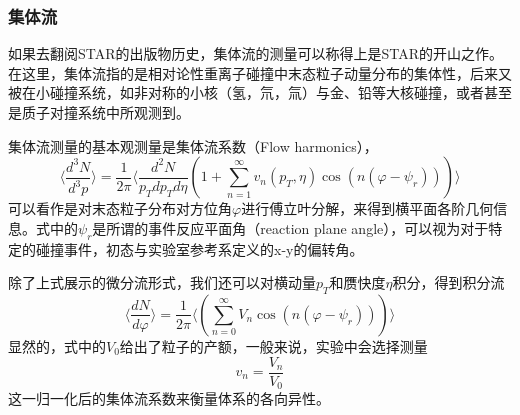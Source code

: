 \documentclass[%
 reprint,
 amsmath,amssymb,
 aps,
]{revtex4-1}
\begin{document}
\subsubsection{\label{sec:Flow}集体流}
如果去翻阅STAR的出版物历史，集体流的测量可以称得上是STAR的开山之作\cite{Ackermann:2000tr}。在这里，集体流指的是相对论性重离子碰撞中末态粒子动量分布的集体性，后来又被在小碰撞系统，如非对称的小核（氢，氘，氚）与金、铅等大核碰撞，或者甚至是质子对撞系统中所观测到。

集体流测量的基本观测量是集体流系数（Flow harmonics），
\begin{equation}
    \langle \frac{d^3N}{d^3 p} \rangle = \frac{1}{2\pi} \langle \frac{d^2N}{p_Tdp_Td\eta} (1+\sum_{n=1}^\infty v_n(p_T,\eta)\cos(n(\varphi-\psi_r))) \rangle 
\end{equation}
可以看作是对末态粒子分布对方位角$\varphi$进行傅立叶分解，来得到横平面各阶几何信息。式中的$\psi_r$是所谓的事件反应平面角（reaction plane angle），可以视为对于特定的碰撞事件，初态与实验室参考系定义的x-y的偏转角。

除了上式展示的微分流形式，我们还可以对横动量$p_T$和赝快度$\eta$积分，得到积分流
\begin{equation}
    \langle \frac{dN}{d\varphi} \rangle = \frac{1}{2\pi} \langle (\sum_{n=0}^\infty V_n\cos(n(\varphi-\psi_r))) \rangle 
\end{equation}
显然的，式中的$V_0$给出了粒子的产额，一般来说，实验中会选择测量
\begin{equation}
    v_n = \frac{V_n}{V_0}
\end{equation}
这一归一化后的集体流系数来衡量体系的各向异性。
\end{document}
